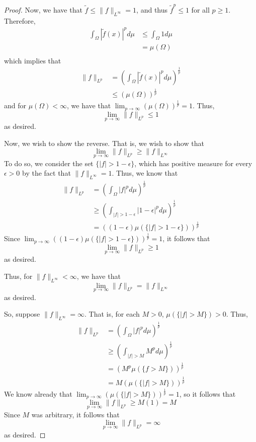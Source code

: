 \documentclass[fontsize=11pt]{scrartcl} %
\numberwithin{equation}{section} %
\numberwithin{figure}{section} %
\numberwithin{table}{section} %
\begin{document}
\begin{proof}
    Now, we have that $\tilde{f} \leq \|f\|_{L^{\infty}} = 1$, and thus
    $\tilde{f}^p\leq 1$ for all $p\geq 1$. Therefore,
    \[
        \begin{aligned}
            \int_{\Omega}|\tilde{f}(x)|^pd\mu &\leq \int_{\Omega}1d\mu\\
                                            &=\mu(\Omega)\\
        \end{aligned}
    \]
    which implies that
    \[
        \begin{aligned}
        \|f\|_{L^p} &=
        \left(\int_{\Omega}|\tilde{f}(x)|^pd\mu\right)^{\frac{1}{p}}\\
            &\leq (\mu(\Omega))^{\frac{1}{p}}
        \end{aligned}
    \]
    and for $\mu(\Omega)<\infty$, we have that
    $\lim_{p\to\infty}(\mu(\Omega))^{\frac{1}{p}} = 1$.
    Thus,
    \[
        \lim_{p\to\infty}\|f\|_{L^p} \leq 1
    \]
    as desired.

    Now, we wish to show the reverse. That is, we wish to show that
    \[
        \lim_{p\to\infty}\|f\|_{L^p} \geq \|f\|_{L^{\infty}}
    \]
    To do so, we consider the set $\{|f|>1-\epsilon\}$, which has positive
    measure for every $\epsilon>0$ by the fact that $\|f\|_{L^{\infty}} = 1$.
    Thus, we know that
    \[
        \begin{aligned}
            \|f\|_{L^p} &=\left(\int_{\Omega}|f|^pd\mu\right)^{\frac{1}{p}}\\
                        &\geq
                        \left(\int_{|f|>1-\epsilon}|1-\epsilon|^pd\mu\right)^{\frac{1}{p}}\\
                        &=((1-\epsilon)\mu(\{|f|>1-\epsilon\}))^{\frac{1}{p}}
        \end{aligned}
    \]
    Since $\lim_{p\to\infty}((1-\epsilon)\mu(\{|f|>1-\epsilon\}))^{\frac{1}{p}}
    = 1$, it follows that
    \[
        \lim_{p\to\infty}\|f\|_{L^p} \geq 1
    \]
    as desired.

    Thus, for $\|f\|_{L^{\infty}} < \infty$, we have that
    \[
        \lim_{p\to\infty}\|f\|_{L^p} = \|f\|_{L^{\infty}}
    \]
    as desired.

    So, suppose $\|f\|_{L^{\infty}} = \infty$. That is, for each $M>0$,
    $\mu(\{|f|>M\})>0$. Thus,
    \[
        \begin{aligned}
            \|f\|_{L^p} &= \left(\int_{\Omega}|f|^pd\mu\right)^{\frac{1}{p}}\\
                        &\geq \left(\int_{|f|>M}M^pd\mu\right)^{\frac{1}{p}}\\
                        &= \left(M^p\mu(\{f>M\})\right)^{\frac{1}{p}}\\
                        &= M(\mu(\{|f|>M\}))^{\frac{1}{p}}
        \end{aligned}
    \]
    We know already that $\lim_{p\to\infty}(\mu(\{|f|>M\}))^{\frac{1}{p}} = 1$,
    so it follows that
    \[
        \lim_{p\to\infty}\|f\|_{L^p} \geq M(1) = M
    \]
    Since $M$ was arbitrary, it follows that
    \[
        \lim_{p\to\infty}\|f\|_{L^p} = \infty
    \]
    as desired.
\end{proof}
\end{document}
